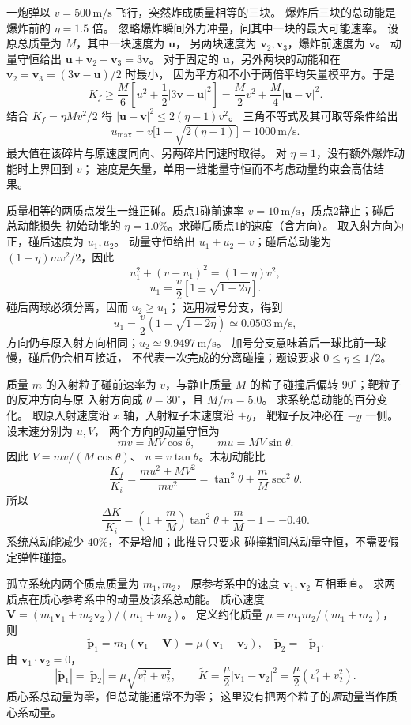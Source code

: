 一炮弹以 $v=500\,\mathrm{m/s}$ 飞行，突然炸成质量相等的三块。
爆炸后三块的总动能是爆炸前的 $\eta=1.5$ 倍。
忽略爆炸瞬间外力冲量，问其中一块的最大可能速率。
\exsolution
设原总质量为 $M$，其中一块速度为 $\bm u$，
另两块速度为 $\bm v_2,\bm v_3$，爆炸前速度为 $\bm v$。
动量守恒给出
$\bm u+\bm v_2+\bm v_3=3\bm v$。
对于固定的 $\bm u$，另外两块的动能和在
$\bm v_2=\bm v_3=(3\bm v-\bm u)/2$ 时最小，
因为平方和不小于两倍平均矢量模平方。于是
\[
 K_f\ge\frac M6\left[
 u^2+\frac12|3\bm v-\bm u|^2\right]
 =\frac M2v^2+\frac M4|\bm u-\bm v|^2 .
\]
结合 $K_f=\eta Mv^2/2$ 得
$|\bm u-\bm v|^2\le2(\eta-1)v^2$。
三角不等式及其可取等条件给出
\[
\boxed{u_{\max}=v\bigl[1+\sqrt{2(\eta-1)}\bigr]
=1000\,\mathrm{m/s}}.
\]
最大值在该碎片与原速度同向、另两碎片同速时取得。
\excheck 对 $\eta=1$，没有额外爆炸动能时上界回到 $v$；
速度是矢量，单用一维能量守恒而不考虑动量约束会高估结果。

质量相等的两质点发生一维正碰。质点1碰前速率
$v=10\,\mathrm{m/s}$，质点2静止；碰后总动能损失
初始动能的 $\eta=1.0\%$。求碰后质点1的速度（含方向）。
\exsolution
取入射方向为正，碰后速度为 $u_1,u_2$。
动量守恒给出 $u_1+u_2=v$；碰后总动能为
$(1-\eta)mv^2/2$，因此
\[
u_1^2+(v-u_1)^2=(1-\eta)v^2,
\]
\[
u_1=\frac v2\left[1\pm\sqrt{1-2\eta}\right].
\]
碰后两球必须分离，因而 $u_2\ge u_1$；
选用减号分支，得到
\[
\boxed{u_1=\frac v2(1-\sqrt{1-2\eta})
\simeq0.0503\,\mathrm{m/s}},
\]
方向仍与原入射方向相同；$u_2\simeq9.9497\,\mathrm{m/s}$。
\excheck 加号分支意味着后一球比前一球慢，碰后仍会相互接近，
不代表一次完成的分离碰撞；题设要求 $0\le\eta\le1/2$。

质量 $m$ 的入射粒子碰前速率为 $v$，与静止质量
$M$ 的粒子碰撞后偏转 $90^\circ$；靶粒子的反冲方向与原
入射方向成 $\theta=30^\circ$，且 $M/m=5.0$。
求系统总动能的百分变化。
\exsolution
取原入射速度沿 $x$ 轴，入射粒子末速度沿 $+y$，
靶粒子反冲必在 $-y$ 一侧。设末速分别为 $u,V$，
两个方向的动量守恒为
\[
mv=MV\cos\theta,\qquad mu=MV\sin\theta.
\]
因此 $V=mv/(M\cos\theta)$、
$u=v\tan\theta$。末初动能比
\[
\frac{K_f}{K_i}
=\frac{mu^2+MV^2}{mv^2}
=\tan^2\theta+\frac mM\sec^2\theta.
\]
所以
\[
\boxed{\frac{\Delta K}{K_i}
=\left(1+\frac mM\right)\tan^2\theta+
\frac mM-1=-0.40}.
\]
\excheck 系统总动能减少 $40\%$，不是增加；此推导只要求
碰撞期间总动量守恒，不需要假定弹性碰撞。

孤立系统内两个质点质量为 $m_1,m_2$，
原参考系中的速度 $\bm v_1,\bm v_2$ 互相垂直。
求两质点在质心参考系中的动量及该系总动能。
\exsolution
质心速度
$\bm V=(m_1\bm v_1+m_2\bm v_2)/(m_1+m_2)$。
定义约化质量 $\mu=m_1m_2/(m_1+m_2)$，则
\[
\widetilde{\bm p}_1
=m_1(\bm v_1-\bm V)=\mu(\bm v_1-\bm v_2),
\quad
\widetilde{\bm p}_2=-\widetilde{\bm p}_1.
\]
由 $\bm v_1\cdot\bm v_2=0$，
\[
\boxed{|\widetilde{\bm p}_1|
=|\widetilde{\bm p}_2|=\mu\sqrt{v_1^2+v_2^2}},
\qquad
\boxed{\widetilde K
=\frac{\mu}{2}|\bm v_1-\bm v_2|^2
=\frac{\mu}{2}(v_1^2+v_2^2)}.
\]
\excheck 质心系总动量为零，但总动能通常不为零；
这里没有把两个粒子的\emph{原}动量当作质心系动量。

